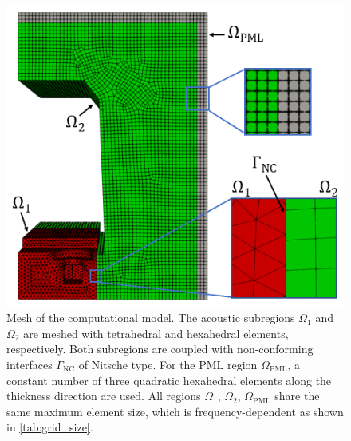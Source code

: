 {\begin{figure}
	\centering
	\includegraphics{fig/chap4/mesh/Mesh_with_labels_small.png}
	\caption{Mesh of the computational model. The acoustic subregions $\Omega_1$ and $\Omega_2$ are meshed with tetrahedral and hexahedral elements, respectively. Both subregions are coupled with non-conforming interfaces $\Gamma_\text{NC}$ of Nitsche type. For the PML region $\Omega_{\text{PML}}$, a constant number of three quadratic hexahedral elements along the thickness direction are used. All regions $\Omega_1$, $\Omega_2$, $\Omega_{\text{PML}}$ share the same maximum element size, which is frequency-dependent as shown in \cref{tab:grid_size}.}
	\label{fig:mesh}
\end{figure}

}
